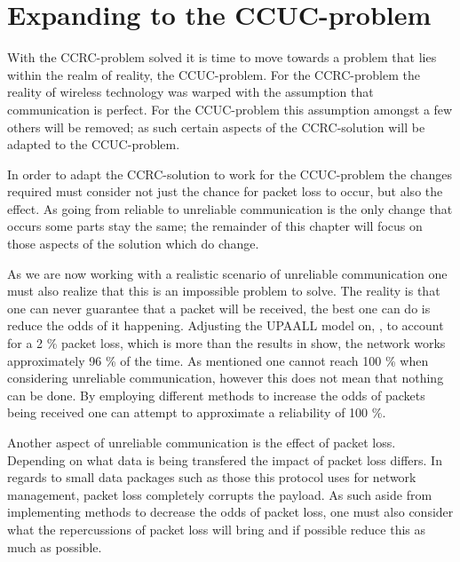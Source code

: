 \chapter{Expanding to the CCUC-problem}\label{CCUC}
With the CCRC-problem solved it is time to move towards a problem that lies within the realm of reality, the CCUC-problem.
For the CCRC-problem the reality of wireless technology was warped with the assumption that communication is perfect.
For the CCUC-problem this assumption amongst a few others will be removed; as such certain aspects of the CCRC-solution will be adapted to the CCUC-problem.

In order to adapt the CCRC-solution to work for the CCUC-problem the changes required must consider not just the chance for packet loss to occur, but also the effect.
As going from reliable to unreliable communication is the only change that occurs some parts stay the same; the remainder of this chapter will focus on those aspects of the solution which do change.

\bigskip \noindent
As we are now working with a realistic scenario of unreliable communication one must also realize that this is an impossible problem to solve.
The reality is that one can never guarantee that a packet will be received, the best one can do is reduce the odds of it happening.
Adjusting the UPAALL model on, \myref{}, to account for a 2 \% packet loss, which is more than the results in  show, the network works approximately 96 \% of the time.
As mentioned one cannot reach 100 \% when considering unreliable communication, however this does not mean that nothing can be done.
By employing different methods to increase the odds of packets being received one can attempt to approximate a reliability of 100 \%.

Another aspect of unreliable communication is the effect of packet loss.
Depending on what data is being transfered the impact of packet loss differs.
In regards to small data packages such as those this protocol uses for network management, packet loss completely corrupts the payload.
As such aside from implementing methods to decrease the odds of packet loss, one must also consider what the repercussions of packet loss will bring and if possible reduce this as much as possible.




